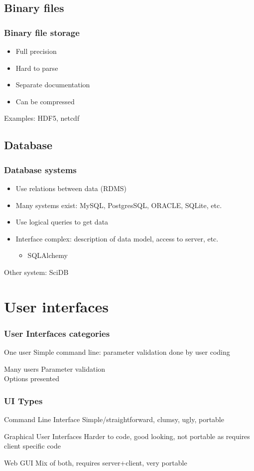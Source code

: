 \documentclass[14pt]{beamer}
\begin{document}
\subsection{Binary files}
\begin{frame}
\frametitle{Binary file storage}
\begin{itemize}
\item Full precision
\item Hard to parse
\item Separate documentation
\item Can be compressed
\end{itemize}
Examples: HDF5, netcdf
\end{frame}

\subsection{Database}
\begin{frame}
\frametitle{Database systems}
\begin{itemize}
\item Use relations between data (RDMS)
\item Many systems exist: MySQL, PostgresSQL, ORACLE, SQLite, etc.
\item Use logical queries to get data
\item Interface complex: description of data model, access to server, etc.
\begin{itemize}
\item SQLAlchemy
\end{itemize}
\end{itemize}
Other system: SciDB
\end{frame}


\section{User interfaces}
\begin{frame}
\frametitle{User Interfaces categories}
\begin{block}{One user}
Simple command line: parameter validation done by user coding
\end{block}
\begin{block}{Many users}
Parameter validation\\
Options presented
\end{block}
\end{frame}

\begin{frame}
\frametitle{UI Types}
\begin{block}{Command Line Interface}
Simple/straightforward, clumsy, ugly, portable
\end{block}
\begin{block}{Graphical User Interfaces}
Harder to code, good looking, not portable as requires client specific code
\end{block}
\begin{block}{Web GUI}
Mix of both, requires server+client, very portable
\end{block}
\end{frame}
\end{document}
